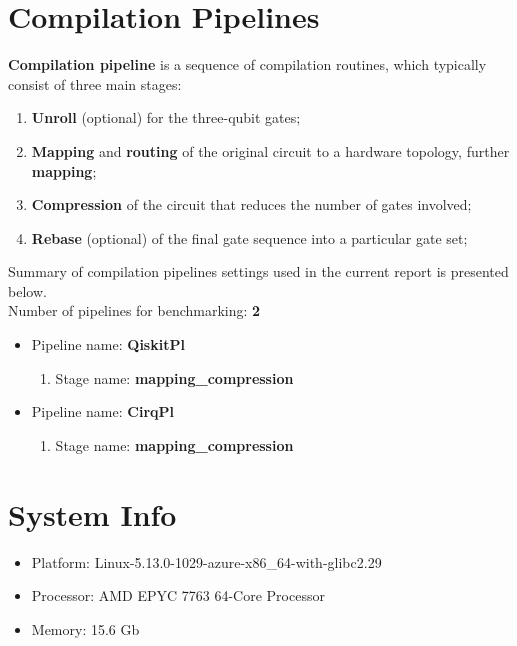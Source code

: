 \documentclass{report}%
\begin{document}
%
\clearpage

%
\section{Compilation Pipelines}%
\label{sec:CompilationPipelines}%

%
\textbf{Compilation pipeline} is a sequence of compilation routines,
                which typically consist of three main stages:%
\begin{enumerate}%
\item%
\textbf{Unroll} (optional) for the three-qubit gates;%
\item%
\textbf{Mapping} and \textbf{routing} of the original circuit to
                    a hardware topology, further \textbf{mapping};%
\item%
\textbf{Compression} of the circuit that reduces the number of gates involved;%
\item%
\textbf{Rebase} (optional) of the final gate sequence into a particular gate set;%
\end{enumerate}%
Summary of compilation pipelines settings used in the current report is presented below. \\ %
Number of pipelines for benchmarking: \textbf{2}%
\begin{itemize}%
\item%
Pipeline name: \textbf{QiskitPl}%
\begin{enumerate}%
\item%
Stage name: \textbf{mapping\_compression}%
\end{enumerate}%
\item%
Pipeline name: \textbf{CirqPl}%
\begin{enumerate}%
\item%
Stage name: \textbf{mapping\_compression}%
\end{enumerate}%
\end{itemize}%
\section{System Info}%
\label{sec:SystemInfo}%
\begin{itemize}%
\item%
Platform: Linux{-}5.13.0{-}1029{-}azure{-}x86\_64{-}with{-}glibc2.29%
\item%
Processor: AMD EPYC 7763 64{-}Core Processor%
\item%
Memory: 15.6 Gb%
\end{itemize}
\end{document}

